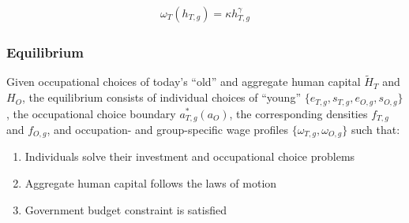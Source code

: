 \documentclass[11pt]{beamer}
\begin{document}
\begin{frame}
\begin{itemize}
\begin{align*}
					\omega_T(h_{T,g})  =  \kappa h_{T,g}^\gamma 
	\end{align*}
\end{itemize}

\end{frame}

\begin{frame}
\frametitle{Equilibrium}
\label{eqm}
Given occupational choices of today's ``old'' and aggregate human capital $\widetilde{H}_{T}$ and ${H}_{O}$, the equilibrium consists of individual choices of ``young'' $\{e_{T,g}, s_{T,g}, e_{O,g}, s_{O,g}\}$, the occupational choice boundary $a^*_{T,g}(a_O)$, the corresponding densities $f_{T,g}$ and $f_{O,g}$, and occupation- and group-specific wage profiles $\{\omega_{T,g}, \omega_{O,g}\}$ such that:
\begin{enumerate}
	\item Individuals solve their investment and occupational choice problems \hyperlink{timeinv}{} \hyperlink{goodinv}{}
	\item Aggregate human capital follows the laws of motion \hyperlink{laws}{}
	\item Government budget constraint is satisfied
\end{enumerate}
\end{frame}
\end{document}
